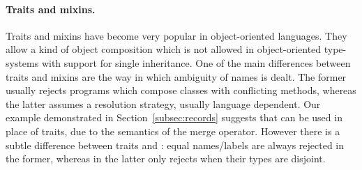 
%
%
%
%
%
%

\paragraph{Traits and mixins.}
Traits \cite{ducasse2006traits,fisher04atyped,odersky2005scalable} and mixins 
\cite{bracha1990mixin,ancona96algebraic,flatt1998classes,findler1998modular,ancona2003jam,bettini2004corecalculus} 
have become very popular in object-oriented languages. 
They allow a kind of object composition which is not allowed in
object-oriented type-systems with support for single inheritance.
One of the main differences between traits and mixins are the way in
which ambiguity of names is dealt.
The former usually rejects programs which compose classes with 
conflicting methods, whereas the latter assumes a resolution strategy,
usually language dependent. 
Our example demonstrated in Section~\ref{subsec:records} suggests that
\name can be used in place of traits, due to the semantics of the merge
operator.
However there is a subtle difference between traits and \name: equal 
names/labels are always rejected in the former, whereas in the latter only rejects
when their types are disjoint.

